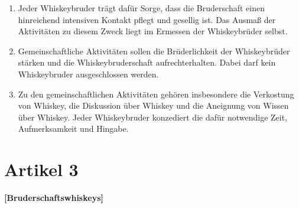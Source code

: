 \documentclass[a4paper,12pt]{scrartcl}
\begin{document}
\begin{enumerate}

\item Jeder Whiskeybruder trägt dafür Sorge, dass die Bruderschaft einen hinreichend intensiven
  Kontakt pflegt und gesellig ist. Das Ausmaß der Aktivitäten zu diesem Zweck liegt im Ermessen der
  Whiskeybrüder selbst.

\item Gemeinschaftliche Aktivitäten sollen die Brüderlichkeit der Whiskeybrüder stärken und die
  Whiskeybruderschaft aufrechterhalten. Dabei darf kein Whiskeybruder ausgeschlossen werden.

\item Zu den gemeinschaftlichen Aktivitäten gehören insbesondere die Verkostung von Whiskey, die
  Diskussion über Whiskey und die Aneignung von Wissen über Whiskey. Jeder Whiskeybruder konzediert
  die dafür notwendige Zeit, Aufmerksamkeit und Hingabe.

\end{enumerate}



\section{Artikel 3}
\label{sec:bruderschaftswhiskeys}
\textbf{[Bruderschaftswhiskeys]}
\end{document}
